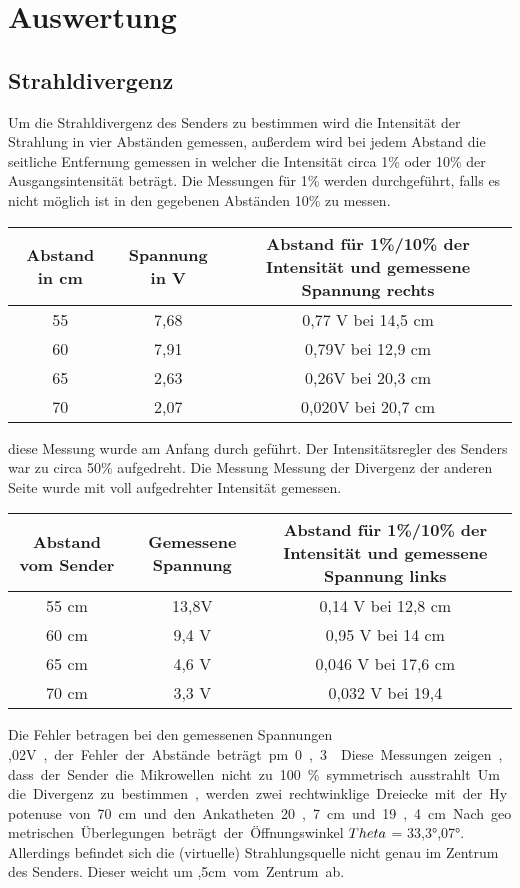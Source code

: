 \newpage
\section{Auswertung}
\subsection{Strahldivergenz}
Um die Strahldivergenz des Senders zu bestimmen wird die Intensität der Strahlung in vier Abständen gemessen, außerdem wird bei jedem Abstand die seitliche Entfernung gemessen in welcher die Intensität circa 1\% oder 10\% der Ausgangsintensität beträgt. 
Die Messungen für 1\% werden durchgeführt, falls es nicht möglich ist in den gegebenen Abständen 10\% zu messen.
\begin{tabular}{|c|c|c|}
\hline 
Abstand in cm & Spannung in V & Abstand für 1\%/10\% der Intensität und gemessene Spannung rechts \\ 
\hline 
55 & 7,68 & 0,77 V bei 14,5 cm \\ 
\hline 
60 & 7,91 & 0,79V bei 12,9 cm \\ 
\hline 
65 & 2,63 & 0,26V bei 20,3 cm \\ 
\hline 
70 & 2,07 & 0,020V bei 20,7 cm \\ 
\hline 
\end{tabular} 
diese Messung wurde am Anfang durch geführt. Der Intensitätsregler des Senders war zu circa 50\% aufgedreht. 
Die Messung Messung der Divergenz der anderen Seite wurde mit voll aufgedrehter Intensität gemessen.
\begin{tabular}{|c|c|c|}
\hline 
Abstand vom Sender & Gemessene Spannung & Abstand für 1\%/10\% der Intensität und gemessene Spannung links \\ 
\hline 
55 cm & 13,8V & 0,14 V bei 12,8 cm \\ 
\hline 
60 cm & 9,4 V & 0,95 V bei 14 cm \\ 
\hline 
65 cm & 4,6 V & 0,046 V bei 17,6 cm \\ 
\hline 
70 cm & 3,3 V & 0,032 V bei 19,4 \\ 
\hline 
\end{tabular} 
Die Fehler betragen bei den gemessenen Spannungen ,02\SI{V}, der Fehler der Abstände beträgt \pm0,3.
Diese Messungen zeigen, dass der Sender die Mikrowellen nicht zu 100\% symmetrisch ausstrahlt.
Um die Divergenz zu bestimmen, werden zwei rechtwinklige Dreiecke mit der Hypotenuse von 70\SI{cm} und den Ankatheten 20,7\SI{cm} und 19,4\SI{cm}. Nach geometrischen Überlegungen beträgt der Öffnungswinkel $ \\Theta $ = 33,3°,07°.
Allerdings befindet sich die (virtuelle) Strahlungsquelle nicht genau im Zentrum des Senders. Dieser weicht um ,5\SI{cm}  vom Zentrum ab.


